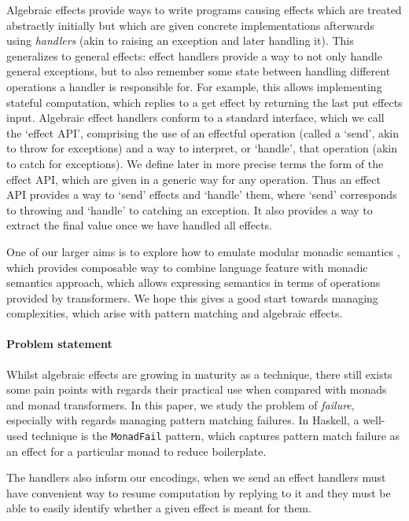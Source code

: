 \documentclass[10pt]{article}
\theoremstyle{definition}
\theoremstyle{remark}
\begin{document}
Algebraic effects
provide ways to write programs causing effects which are treated
abstractly initially but which are given concrete implementations
afterwards using \emph{handlers} (akin to raising an exception and
later handling it).
This generalizes to general effects: effect handlers provide a way to
not only handle general exceptions, but to also remember some state between handling different operations a handler is responsible for.
For example, this allows implementing stateful computation, which replies to a get effect by returning the last put effects input.
Algebraic effect handlers conform to a standard interface, which we call the `effect API', comprising the use of an effectful operation (called a `send', akin to throw for exceptions) and a way to interpret, or `handle', that operation (akin to catch for exceptions). We define later in more precise terms the form of the effect API, which are given in a generic way for any operation.
Thus an effect API provides a way to `send' effects and `handle' them, where `send' corresponds to throwing and `handle' to catching an exception. It also provides a way to extract the final value once we have handled all effects.

One of our larger aims is to explore how to emulate modular monadic semantics \cite{3MT}, which provides composable way to combine language feature with monadic semantics approach, which allows expressing semantics in terms of operations provided by transformers. We hope this gives a good start towards managing complexities, which arise with pattern matching and algebraic effects.

\paragraph{Problem statement}
Whilst algebraic effects are growing in maturity as a technique, there
still exists some pain points with regards their practical use when
compared with monads and monad transformers. In this paper, we
study the problem of \emph{failure}, especially with regards
managing pattern matching failures. In Haskell, a well-used technique
is the \texttt{MonadFail} pattern, which captures pattern match failure
as an effect for a particular monad to reduce boilerplate.

The handlers also inform our encodings, when we send an effect handlers must have convenient way to resume computation by replying to it and they must be able to easily identify whether a given effect is meant for them.
\end{document}
